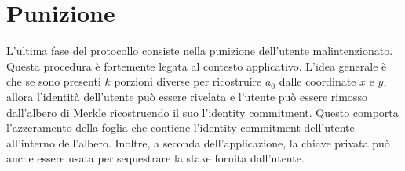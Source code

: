 \section{Punizione}
L'ultima fase del protocollo consiste nella punizione dell'utente malintenzionato. Questa procedura è fortemente legata
al contesto applicativo. L'idea generale è che se sono presenti $k$ porzioni diverse per ricostruire
$a_0$ dalle coordinate $x$ e $y$, allora l'identità dell'utente può essere rivelata e l'utente può essere rimosso
dall'albero di Merkle ricostruendo il suo l'identity commitment. Questo comporta
l'azzeramento della foglia che contiene l'identity commitment dell'utente all'interno dell'albero. Inoltre, a seconda dell'applicazione,
la chiave privata può anche essere usata per sequestrare la stake fornita dall'utente.